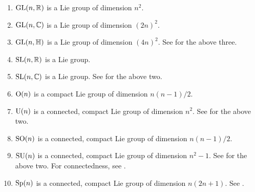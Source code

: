\documentclass[12pt]{article}
\begin{document}
\begin{enumerate}[label=(\alph*)]
	\item $\operatorname{GL}(n, \mathbb{R})$ is a Lie group of dimension $n^{2}$.
	\item $\operatorname{GL}(n, \mathbb{C})$ is a Lie group of dimension $(2n)^{2}$.
	\item $\operatorname{GL}(n, \mathbb{H})$ is a Lie group of dimension $(4n)^{2}$. \newline
	See  for the above three.
	\item $\operatorname{SL}(n, \mathbb{R})$ is a Lie group.
	\item $\operatorname{SL}(n, \mathbb{C})$ is a Lie group. \newline
	See  for the above two.
	\item $\operatorname{O}(n)$ is a compact Lie group of dimension $n(n - 1)/2$.
	\item $\operatorname{U}(n)$ is a connected, compact Lie group of dimension $n^{2}$. \newline
	See  for the above two.
	\item $\operatorname{SO}(n)$ is a connected, compact Lie group of dimension $n(n - 1)/2$.
	\item $\operatorname{SU}(n)$ is a connected, compact Lie group of dimension $n^{2} - 1$. \newline
	See  for the above two. For connectedness, see .
	\item $\operatorname{Sp}(n)$ is a connected, compact Lie group of dimension $n(2n + 1)$. See .
\end{enumerate}
\end{document}
